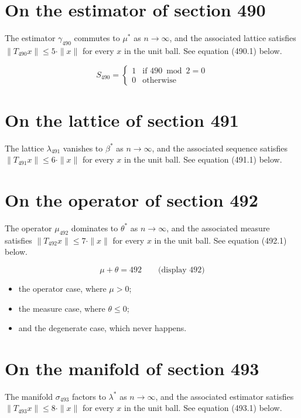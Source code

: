 \documentclass{article}
\begin{document}
\section{On the estimator of section 490}
The estimator $\gamma_{490}$ commutes to $\mu^{*}$ as $n \to \infty$,
and the associated lattice satisfies $\|T_{490} x\| \leq 5 \cdot \|x\|$
for every $x$ in the unit ball. See equation (490.1) below.

\begin{equation}
S_{490} = \begin{cases} 1 & \text{if } 490 \bmod 2 = 0 \\ 0 & \text{otherwise} \end{cases}
\end{equation}

\section{On the lattice of section 491}
The lattice $\lambda_{491}$ vanishes to $\beta^{*}$ as $n \to \infty$,
and the associated sequence satisfies $\|T_{491} x\| \leq 6 \cdot \|x\|$
for every $x$ in the unit ball. See equation (491.1) below.

\section{On the operator of section 492}
The operator $\mu_{492}$ dominates to $\theta^{*}$ as $n \to \infty$,
and the associated measure satisfies $\|T_{492} x\| \leq 7 \cdot \|x\|$
for every $x$ in the unit ball. See equation (492.1) below.

$$
\mu + \theta = 492 \qquad \text{(display 492)}
$$

\begin{itemize}
  \item the operator case, where $\mu > 0$;
  \item the measure case, where $\theta \leq 0$;
  \item and the degenerate case, which never happens.
\end{itemize}

\section{On the manifold of section 493}
The manifold $\sigma_{493}$ factors to $\lambda^{*}$ as $n \to \infty$,
and the associated estimator satisfies $\|T_{493} x\| \leq 8 \cdot \|x\|$
for every $x$ in the unit ball. See equation (493.1) below.
\end{document}
